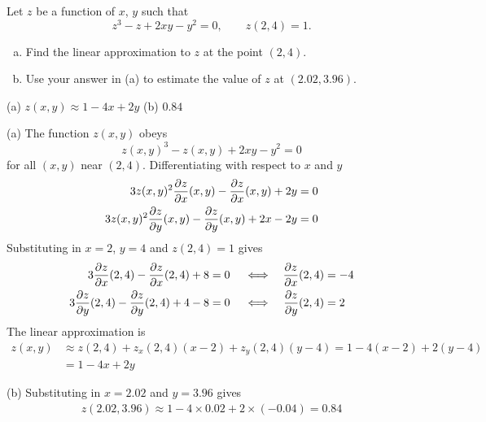 \begin{question}[M200 2000A] %
Let $z$ be a function of $x$, $y$ such that 
\begin{equation*}
z^3 - z + 2xy - y^2 = 0,\qquad z(2, 4) = 1.
\end{equation*}
\begin{enumerate}[(a)]
\item
Find the linear approximation to $z$ at the point $(2, 4)$. 
\item 
Use your answer in (a) to estimate the value of $z$ at 
$(2.02, 3.96)$. 
\end{enumerate}
\end{question}

%

\begin{answer}
(a) $z(x,y)\approx 1-4x+2y$\qquad
(b) $0.84$
\end{answer}

\begin{solution}
(a) The function $z(x,y)$ obeys
\begin{equation*}
z(x,y)^3-z(x,y)+2xy-y^2=0
\end{equation*}
for all $(x,y)$ near $(2,4)$. Differentiating with respect to $x$ and $y$
\begin{align*}
3z(x,y)^2\pdiff{z}{x}(x,y)
       -\pdiff{z}{x}(x,y)+2y&=0 \\
3z(x,y)^2\pdiff{z}{y}(x,y)
       -\pdiff{z}{y}(x,y)+2x-2y&=0 
\end{align*}
Substituting in $x=2$, $y=4$ and $z(2,4)=1$ gives
\begin{alignat*}{5}
3\pdiff{z}{x}(2,4)
       -\pdiff{z}{x}(2,4)+8&=0 &  &\iff &
    \pdiff{z}{x}(2,4) & = -4 \\
3\pdiff{z}{y}(2,4)
       -\pdiff{z}{y}(2,4)+4-8&=0 &  &\iff &
    \pdiff{z}{y}(2,4) & = 2
\end{alignat*}
The linear approximation is
\begin{align*}
z(x,y)&\approx z(2,4)+z_x(2,4)(x-2)+z_y(2,4)(y-4)= 1-4(x-2)+2(y-4) \\
&=1-4x+2y
\end{align*}

(b) Substituting in $x=2.02$ and $y=3.96$ gives
\begin{align*}
z(2.02,3.96)\approx 1-4\times0.02+2\times(-0.04)
=0.84
\end{align*}
\end{solution}




